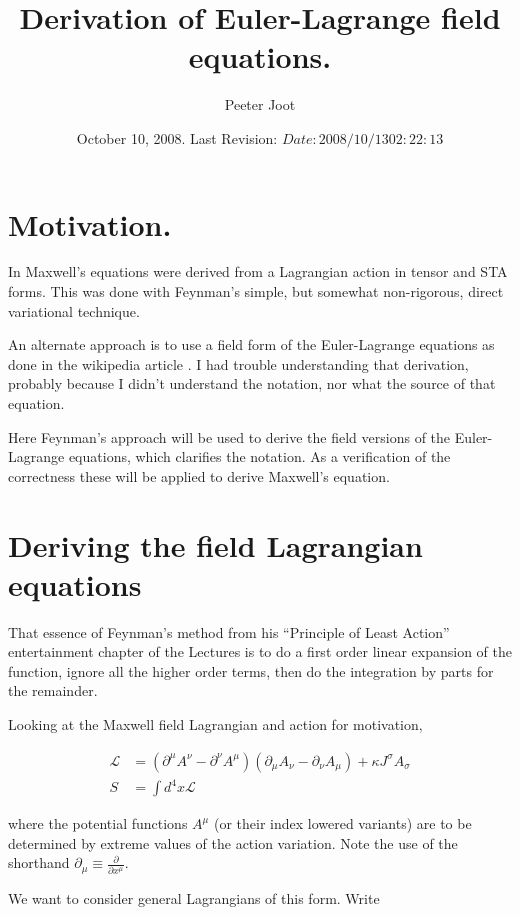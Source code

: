 \documentclass{article}
\title{ Derivation of Euler-Lagrange field equations.}
\author{Peeter Joot}
\date{ October 10, 2008.  Last Revision: $Date: 2008/10/13 02:22:13 $ }
\newcommand{\LL}[0]{\mathcal{L}}
\newcommand{\PD}[2]{\frac{\partial {#2}}{\partial {#1}}}
\begin{document}
\maketitle{}

\tableofcontents

\section{ Motivation. }

In \cite{PJMaxwellLagrangian} Maxwell's equations were derived from
a Lagrangian action in tensor and STA forms.  This was done with 
Feynman's \cite{feynman1963flp} simple, but somewhat non-rigorous, direct variational technique.

An alternate approach is to use a field form of the Euler-Lagrange
equations as done in the wikipedia article \cite{wikiemtensor}.  I had
trouble understanding that derivation, probably because
I didn't understand the notation, nor what the source of that equation.

Here Feynman's approach will be used to derive the field versions of the Euler-Lagrange
equations, which clarifies the notation.  As a verification of the correctness these
will be applied to derive Maxwell's equation.

\section{ Deriving the field Lagrangian equations }

That essence of Feynman's method from his 
``Principle of Least Action'' entertainment chapter of the Lectures is
to do a first order linear expansion of the function, ignore all the higher order terms,
then do the integration by parts for the remainder.

Looking at the Maxwell field Lagrangian and action for motivation,

\begin{align*}
\LL &= (\partial^\mu A^\nu - \partial^\nu A^\mu) (\partial_\mu A_\nu - \partial_\nu A_\mu) + \kappa J^\sigma A_\sigma \\
S &= \int d^4 x \LL
\end{align*}

where the potential functions $A^\mu$ (or their index lowered variants)
are to be determined by extreme values of the action variation.  Note the use of the shorthand
$\partial_\mu \equiv \PD{x^\mu}{}$.

We want to consider general Lagrangians of this form.  Write
\end{document}
